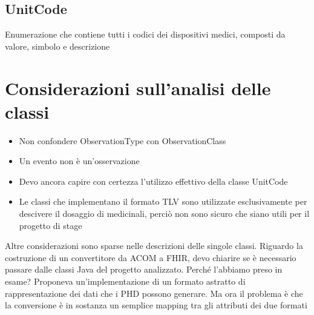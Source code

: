 \documentclass[a4paper]{article}
\begin{document}
        \subsection{UnitCode}
            Enumerazione che contiene tutti i codici dei dispositivi medici, composti da valore, simbolo e descrizione
    \section{Considerazioni sull'analisi delle classi}
        \begin{itemize}
            \item Non confondere ObservationType con ObservationClass
            \item Un evento non è un'osservazione
            \item Devo ancora capire con certezza l'utilizzo effettivo della classe UnitCode
            \item Le classi che implementano il formato TLV sono utilizzate esclusivamente per descivere il dosaggio di medicinali, perciò non sono sicuro che siano utili per il progetto di stage
        \end{itemize}
        Altre considerazioni sono sparse nelle descrizioni delle singole classi.
        Riguardo la costruzione di un convertitore da ACOM a FHIR, devo chiarire se è necessario passare dalle classi Java
        del progetto analizzato. Perché l'abbiamo preso in esame? Proponeva un'implementazione di un formato astratto di rappresentazione 
        dei dati che i PHD possono generare. Ma ora il problema è che la conversione è in sostanza un semplice mapping tra gli attributi dei due formati
\end{document}
